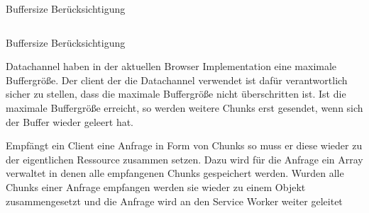 \begin{description}
\begin{listing}[h]
	\inputminted{javascript}{listings/buffersize.js}
	\caption{Buffersize Berücksichtigung}
	\label{lst:code-buffersize}
\end{listing}
\begin{listing}[h]
	\inputminted{javascript}{listings/handle_chunk.js}
	\caption{Buffersize Berücksichtigung}
	\label{lst:code-handle-chunk}
\end{listing}

Datachannel haben in der aktuellen Browser Implementation eine maximale Buffergröße. Der client der die Datachannel verwendet ist dafür verantwortlich sicher zu stellen, dass die maximale Buffergröße nicht überschritten ist. Ist die maximale Buffergröße erreicht, so werden weitere Chunks erst gesendet, wenn sich der Buffer wieder geleert hat.

Empfängt ein Client eine Anfrage in Form von Chunks so muss er diese wieder zu der eigentlichen Ressource zusammen setzen. Dazu wird für die Anfrage ein Array verwaltet in denen alle empfangenen Chunks gespeichert werden. Wurden alle Chunks einer Anfrage empfangen werden sie wieder zu einem Objekt zusammengesetzt und die Anfrage wird an den Service Worker weiter geleitet





\end{description}

